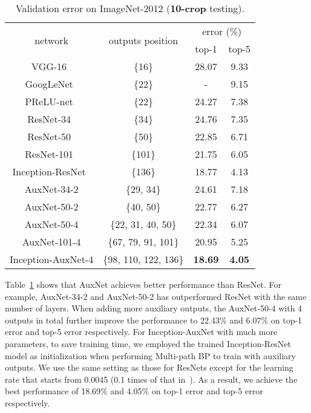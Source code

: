 \documentclass[10pt,onecolumn,letterpaper]{article}
\def\SexyName{AuxNet\xspace}
\begin{document}
\begin{table}[htbp]
  \centering
  \caption{Validation error on ImageNet-2012 (\textbf{10-crop} testing).}
    \begin{tabular}{c|c|c|c}
    \hline
    \multirow{2}[0]{*}{network} & \multirow{2}{*}{outputs position} & \multicolumn{2}{c}{error (\%)} \\
    \cline{3-4}
        &   & top-1 & top-5 \\
    \hline
    VGG-16~\cite{simonyan2014very} & \{16\}  & 28.07 & 9.33 \\
    GoogLeNet~\cite{szegedy2015going} & \{22\}  & - & 9.15 \\
    PReLU-net~\cite{he2015delving} & \{22\}  & 24.27 & 7.38 \\
    \hline
    ResNet-34~\cite{he2015deep} & \{34\}  & 24.76 & 7.35 \\
    ResNet-50~\cite{he2015deep} & \{50\}  & 22.85 & 6.71 \\
    ResNet-101~\cite{he2015deep} & \{101\}  & 21.75 & 6.05 \\
    Inception-ResNet~\cite{DBLP:journals/corr/SzegedyIV16} & \{136\}  & 18.77 & 4.13 \\ \hline \hline
    \SexyName-34-2 & \{29, 34\} & 24.61 & 7.18 \\
    \SexyName-50-2 & \{40, 50\} & 22.77 & 6.27 \\
    \SexyName-50-4 & \{22, 31, 40, 50\} & 22.34 & 6.07 \\
    \SexyName-101-4 & \{67, 79, 91, 101\} & 20.95 & 5.25 \\
    Inception-\SexyName-4 & \{98, 110, 122, 136\} & \textbf{18.69} & \textbf{4.05} \\
    \hline
    \end{tabular}
  \label{tab:imagenet1000}%
\end{table}

Table~\ref{tab:imagenet1000} shows that \SexyName achieves better performance than ResNet.
For example, \SexyName-34-2 and \SexyName-50-2 has outperformed ResNet with the same number of layers. When adding more auxiliary outputs, the \SexyName-50-4 with 4 outputs in total further improve the performance to 22.43\% and 6.07\% on top-1 error and top-5 error respectively.
For Inception-\SexyName with much more parameters, to save training time, we employed the trained Inception-ResNet model as initialization when performing Multi-path BP to train with auxiliary outputs. We use the same setting as those for ResNets except for the learning rate that starts from 0.0045 (0.1 times of that in~\cite{DBLP:journals/corr/SzegedyIV16}). As a result, we achieve the best performance of 18.69\% and 4.05\% on top-1 error and top-5 error respectively.
\end{document}
